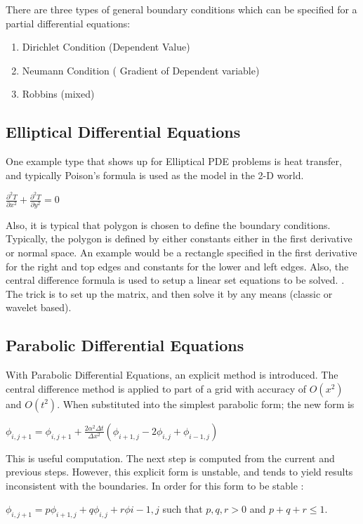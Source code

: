 \documentclass[11pt]{article}
\begin{document}
There are three types of general boundary conditions which can be specified for a partial differential equations:
\begin{enumerate}
\item Dirichlet Condition (Dependent Value) 
\item Neumann Condition ( Gradient of Dependent variable) 
\item Robbins (mixed)
\end{enumerate}

\subsection {Elliptical Differential Equations} 
One example type that shows up for Elliptical PDE problems is heat transfer, and typically Poison's formula is used as the model in the 2-D world.  

$\frac{\partial ^2 T} {\partial x^2} + \frac{\partial ^2 T} {\partial y^2} = 0$  

Also, it is typical that polygon is chosen to define the boundary conditions.   Typically, the polygon is defined by either constants either in the first derivative or normal space.  An example would be a rectangle specified in the first derivative for the right and top edges and constants for the lower and left edges.  Also, the central difference formula is used to setup a linear set equations to be solved.  \cite{appliedmethods}.  The trick is to set up the matrix, and then solve it by any means (classic or wavelet based).  

\subsection {Parabolic Differential Equations}
With Parabolic Differential Equations, an explicit method is introduced.  The central difference method is applied to part of a grid with accuracy of $O(x^2)$ and $O(t^2)$.  When substituted into the simplest parabolic form;  the new form is 

$\phi _{i,j+1} = \phi _{i,j+1} + \frac{2\alpha^2 \Delta t} {\Delta x^2}  (\phi _{i+1,j} -2 \phi _{i,j} + \phi _{i-1,j})   $

This is useful computation.  The next step is computed from the current and previous steps.   However, this explicit form is unstable, and tends to yield results inconsistent with the boundaries.   In order for this form to be stable :

$\phi _{i,j+1} = p \phi _{i+1,j} + q \phi _{i,j} + r \phi {i-1,j} $ such that $p,q,r > 0$ and $ p + q + r \le 1$.  
\end{document}

